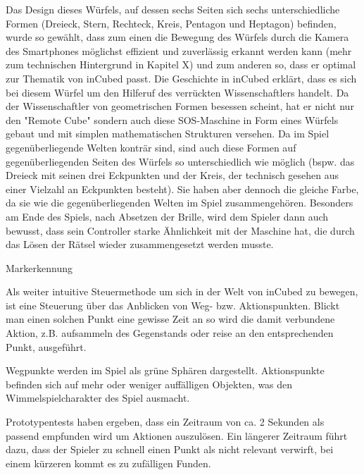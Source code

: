 Das Design dieses Würfels, auf dessen sechs Seiten sich sechs unterschiedliche Formen (Dreieck, Stern, Rechteck, Kreis, Pentagon und Heptagon) befinden, wurde so gewählt, dass zum einen die Bewegung des Würfels durch die Kamera des Smartphones möglichst effizient und zuverlässig erkannt werden kann (mehr zum technischen Hintergrund in Kapitel X) und zum anderen so, dass er optimal zur Thematik von inCubed passt. Die Geschichte in inCubed erklärt, dass es sich bei diesem Würfel um den Hilferuf des verrückten Wissenschaftlers handelt. Da der Wissenschaftler von geometrischen Formen besessen scheint, hat er nicht nur den "Remote Cube" sondern auch diese SOS-Maschine in Form eines Würfels gebaut und mit simplen mathematischen Strukturen versehen. Da im Spiel gegenüberliegende Welten konträr sind, sind auch diese Formen auf gegenüberliegenden Seiten des Würfels so unterschiedlich wie möglich (bspw. das Dreieck mit seinen drei Eckpunkten und der Kreis, der technisch gesehen aus einer Vielzahl an Eckpunkten besteht). Sie haben aber dennoch die gleiche Farbe, da sie wie die gegenüberliegenden Welten im Spiel zusammengehören. Besonders am Ende des Spiels, nach Absetzen der Brille, wird dem Spieler dann auch bewusst, dass sein Controller starke Ähnlichkeit mit der Maschine hat, die durch das Lösen der Rätsel wieder zusammengesetzt werden musste.

Markerkennung


Als weiter intuitive Steuermethode um sich in der Welt von inCubed zu bewegen, ist eine Steuerung über das Anblicken von Weg- bzw. Aktionspunkten. Blickt man einen solchen Punkt eine gewisse Zeit an so wird die damit verbundene Aktion, z.B. aufsammeln des Gegenstands oder reise an den entsprechenden Punkt, ausgeführt.

Wegpunkte werden im Spiel als grüne Sphären dargestellt. Aktionspunkte befinden sich auf mehr oder weniger auffälligen Objekten, was den Wimmelspielcharakter des Spiel ausmacht.

Prototypentests haben ergeben, dass ein Zeitraum von ca. 2 Sekunden als passend empfunden wird um Aktionen auszulösen. Ein längerer Zeitraum führt dazu, dass der Spieler zu schnell einen Punkt als nicht relevant verwirft, bei einem kürzeren kommt es zu zufälligen Funden.
